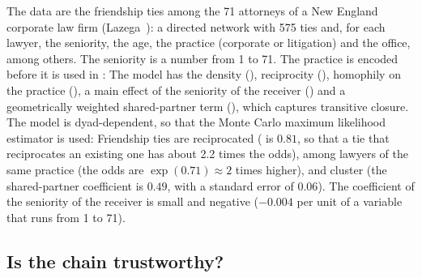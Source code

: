 The data are the friendship ties among the 71 attorneys of a New England corporate law firm (Lazega~\cite{lazega2001}): a directed network with 575 ties and, for each lawyer, the seniority, the age, the practice (corporate or litigation) and the office, among others. The seniority is a number from 1 to 71.
The practice is encoded before it is used in :
The model has the density (), reciprocity (), homophily on the practice (), a main effect of the seniority of the receiver () and a geometrically weighted shared-partner term (), which captures transitive closure. The model is dyad-dependent, so that the Monte Carlo maximum likelihood estimator is used:
Friendship ties are reciprocated ( is $0.81$, so that a tie that reciprocates an existing one has about 2.2 times the odds), among lawyers of the same practice (the odds are $\exp(0.71)\approx2$ times higher), and cluster (the shared-partner coefficient is $0.49$, with a standard error of $0.06$). The coefficient of the seniority of the receiver is small and negative ($-0.004$ per unit of a variable that runs from 1 to 71).

\subsection{Is the chain trustworthy?}

